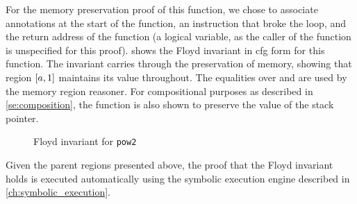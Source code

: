 For the memory preservation proof of this function, we chose to associate annotations
at the start of the function, an instruction that broke the loop,
and the return address of the function
(a logical variable, as the caller of the function is unspecified for this proof).
 shows the Floyd invariant in \ac{cfg} form for this function.
The invariant carries through the preservation of memory,
showing that region $[a,1]$ maintains its value throughout.
The equalities over  and 
are used by the memory region reasoner.
For compositional purposes as described in \cref{se:composition},
the function is also shown to preserve the value of the stack pointer.
\begin{figure}
  \centering
  \caption{Floyd invariant for \texttt{pow2}}\label{fig:pow2cfg}
\end{figure}
Given the parent regions presented above, the proof that the Floyd invariant holds
is executed automatically using the symbolic execution engine
described in \cref{ch:symbolic_execution}.

